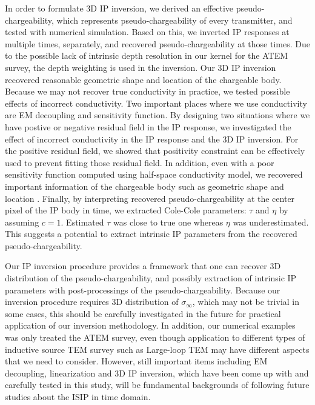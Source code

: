 \documentclass[extra,mreferee]{gji}
\newcommand{\siginf}{\sigma_\infty}
\begin{document}
In order to formulate 3D IP inversion, we derived an effective pseudo-chargeability, which represents pseudo-chargeability of every transmitter, and tested with numerical simulation. 
Based on this, we inverted IP responses at multiple times, separately, and recovered pseudo-chargeability at those times.
Due to the possible lack of intrinsic depth resolution in our kernel for the ATEM survey, the depth weighting is used in the inversion.  
Our 3D IP inversion recovered reasonable geometric shape and location of the chargeable body. 
Because we may not recover true conductivity in practice, we tested possible effects of incorrect conductivity. 
Two important places where we use conductivity are EM decoupling and sensitivity function. 
By designing two situations where we have postive or negative residual field in the IP response, we investigated the effect of incorrect conductivity in the IP response and the 3D IP inversion. 
For the positive residual field, we showed that positivity constraint can be effectively used to prevent fitting those residual field. 
In addition, even with a poor sensitivity function computed using half-space conductivity model, we recovered important information of the chargeable body such as geometric shape and location . 
Finally, by interpreting recovered pseudo-chargeability at the center pixel of the IP body in time, we extracted Cole-Cole parameters: $\tau$ and $\eta$ by assuming $c=1$. 
Estimated $\tau$ was close to true one whereas $\eta$ was underestimated.
This suggests a potential to extract intrinsic IP parameters from the recovered pseudo-chargeability. 

Our IP inversion procedure provides a framework that one can recover 3D distribution of the pseudo-chargeability, and possibly extraction of intrinsic IP parameters with post-processings of the pseudo-chargeability. 
Because our inversion procedure requires 3D distribution of $\siginf$, which may not be trivial in some cases, this should be carefully investigated in the future for practical application of our inversion methodology. 
In addition, our numerical examples was only treated the ATEM survey, even though application to different types of inductive source TEM survey such as Large-loop TEM may have different aspects that we need to consider. 
However, still important items including EM decoupling, linearization and 3D IP inversion, which have been come up with and carefully tested in this study, will be fundamental backgrounds of following future studies about the ISIP in time domain. 
\end{document}
